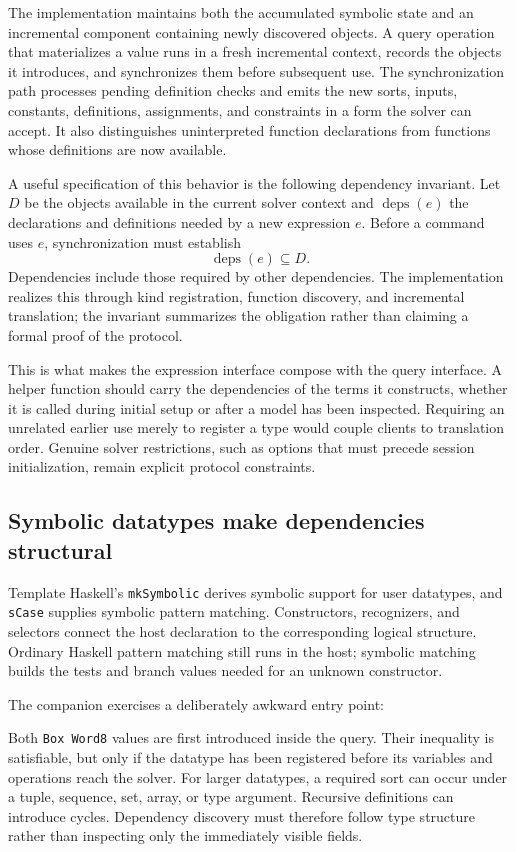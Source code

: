 \documentclass[acmsmall,screen,nonacm]{acmart}
\newcommand{\code}[1]{\texttt{#1}}
\newcommand{\paperlisting}[1]{\par\noindent
  \begin{minipage}{\linewidth}
  
  \end{minipage}\par}
\begin{document}
The implementation maintains both the accumulated symbolic state and an
incremental component containing newly discovered objects. A query operation
that materializes a value runs in a fresh incremental context, records the
objects it introduces, and synchronizes them before subsequent use. The
synchronization path processes pending definition checks and emits the new
sorts, inputs, constants, definitions, assignments, and constraints in a form
the solver can accept. It also distinguishes uninterpreted function declarations
from functions whose definitions are now available.

A useful specification of this behavior is the following dependency invariant.
Let $D$ be the objects available in the current solver context and
$\operatorname{deps}(e)$ the declarations and definitions needed by a new
expression $e$. Before a command uses $e$, synchronization must establish
\[
                   \operatorname{deps}(e) \subseteq D.
\]
Dependencies include those required by other dependencies. The implementation
realizes this through kind registration, function discovery, and incremental
translation; the invariant summarizes the obligation rather than claiming a
formal proof of the protocol.

This is what makes the expression interface compose with the query interface.
A helper function should carry the dependencies of the terms it constructs,
whether it is called during initial setup or after a model has been inspected.
Requiring an unrelated earlier use merely to register a type would couple
clients to translation order. Genuine solver restrictions, such as options
that must precede session initialization, remain explicit protocol constraints.

\subsection{Symbolic datatypes make dependencies structural}

Template Haskell's \code{mkSymbolic} derives symbolic support for user datatypes,
and \code{sCase} supplies symbolic pattern matching. Constructors, recognizers,
and selectors connect the host declaration to the corresponding logical
structure. Ordinary Haskell pattern matching still runs in the host; symbolic
matching builds the tests and branch values needed for an unknown constructor.

The companion exercises a deliberately awkward entry point:
\paperlisting{datatype}
Both \code{Box Word8} values are first introduced inside the query. Their
inequality is satisfiable, but only if the datatype has been registered before
its variables and operations reach the solver. For larger datatypes, a required
sort can occur under a tuple, sequence, set, array, or type argument. Recursive
definitions can introduce cycles. Dependency discovery must therefore follow
type structure rather than inspecting only the immediately visible fields.
\end{document}
